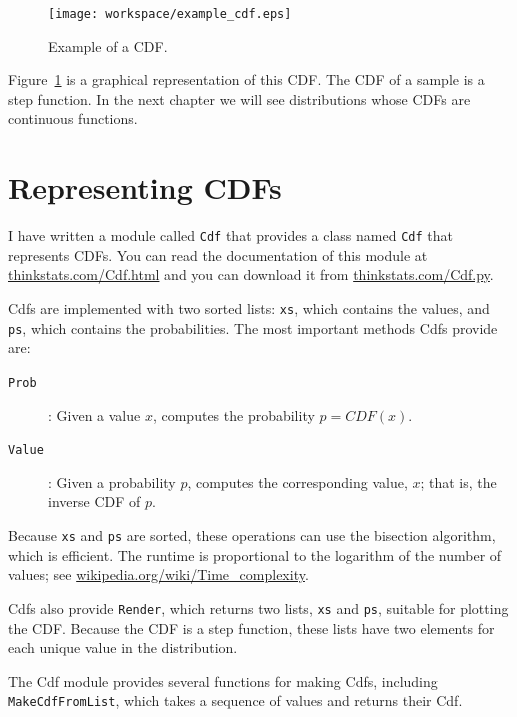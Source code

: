\documentclass[12pt]{book}
\begin{document}
\begin{figure}
\centerline{\texttt{[image: workspace/example\_cdf.eps]}}
\caption{Example of a CDF.}
\label{example_cdf}
\end{figure}

Figure~\ref{example_cdf} is a graphical representation of this CDF.
The CDF of a sample is a step function.  In the next chapter we
will see distributions whose CDFs are continuous functions.  


\section{Representing CDFs}


I have written a module called {\tt Cdf} that provides a class named
{\tt Cdf} that represents CDFs.  You can read the documentation of
this module at \url{thinkstats.com/Cdf.html} and you can download it
from \url{thinkstats.com/Cdf.py}.

Cdfs are implemented with two sorted lists: {\tt xs}, which contains
the values, and {\tt ps}, which contains the probabilities.  The
most important methods Cdfs provide are:

\begin{description}

\item[{\tt Prob}]: Given a value $x$, computes the probability $p = CDF(x)$.

\item[{\tt Value}]: Given a probability $p$, computes the
corresponding value, $x$; that is, the inverse CDF of $p$.

\end{description}

Because {\tt xs} and {\tt ps} are sorted, these operations can use the
bisection algorithm, which is efficient.  The runtime is proportional
to the logarithm of the number of values; see
\url{wikipedia.org/wiki/Time_complexity}.


Cdfs also provide {\tt Render}, which returns two lists, {\tt xs} and
{\tt ps}, suitable for plotting the CDF.  Because the CDF is a
step function, these lists have two elements for each unique
value in the distribution.

The Cdf module provides several functions for making Cdfs, including
{\tt MakeCdfFromList}, which takes a sequence of values
and returns their Cdf.
\end{document}
